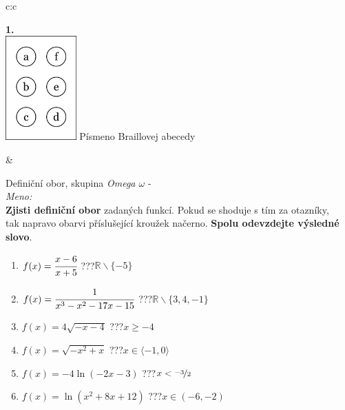 \documentclass[10pt]{report}
\begin{document}
\begin{tabular}{c:c}
\begin{minipage}[c][99mm][t]{0.49\linewidth}
\begin{center}
\begin{minipage}{0.20\linewidth}
\begin{center}
{\Huge\bfseries 1.} \\[2mm]
\includegraphics[height=40mm]{../images/braille.png}
{\small Písmeno Braillovej abecedy}
\end{center}
\end{minipage}
\end{center}
\end{minipage}
&
\begin{minipage}[c][99mm][t]{0.49\linewidth}
\begin{center}
\vspace{7mm}
{\huge Definiční obor, skupina \textit{Omega $\omega$} -}\\[4.5mm]
\textit{Meno:}\phantom{xxxxxxxxxxxxxxxxxxxxxxxxxxxxxxxxxxxxxxxxxxxxxxxxxxxxxxxxxxxxxxxxx}\\[3.5mm]
\textbf{Zjisti definiční obor} zadaných funkcí. Pokud se shoduje s tím za otazníky,\\tak napravo obarvi příslušející kroužek načerno. \textbf{Spolu odevzdejte výsledné slovo}.\\[3mm]
\begin{minipage}{0.77\linewidth}
\begin{center}
\begin{varwidth}{\textwidth}
\begin{enumerate}
\normalsize
\item $f(x)=\cfrac{x-6}{x+5}$\quad \dotfill\; ???\;\dotfill \quad $\mathbb{R}\smallsetminus\{-5\}$
\item $f(x)=\cfrac{1}{x^3-x^2-17x-15}$\quad \dotfill\; ???\;\dotfill \quad $\mathbb{R}\smallsetminus\{3,4,-1\}$
\item $f(x)=4\sqrt{-x-4}$\quad \dotfill\; ???\;\dotfill \quad $x\geq-4$
\item $f(x)=\sqrt{-x^2+x}$\quad \dotfill\; ???\;\dotfill \quad $x\in\langle-1 , 0\rangle$
\item $f(x)=-4\ln{(-2x-3)}$\quad \dotfill\; ???\;\dotfill \quad $x<\nicefrac{-3}{2}$
\item $f(x)=\ln{(x^2+8x+12)}$\quad \dotfill\; ???\;\dotfill \quad $x\in(-6 , -2)$

\end{enumerate}
\end{varwidth}
\end{center}
\end{minipage}
\end{center}
\end{minipage}
\end{tabular}
\end{document}
